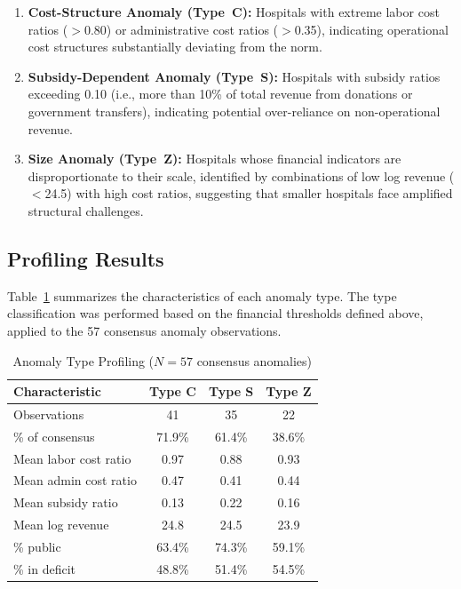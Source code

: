 \documentclass{ieeeaccess}
\begin{document}
\begin{enumerate}
    \item \textbf{Cost-Structure Anomaly (Type~C):} Hospitals with extreme labor cost ratios ($>$0.80) or administrative cost ratios ($>$0.35), indicating operational cost structures substantially deviating from the norm.
    \item \textbf{Subsidy-Dependent Anomaly (Type~S):} Hospitals with subsidy ratios exceeding 0.10 (i.e., more than 10\% of total revenue from donations or government transfers), indicating potential over-reliance on non-operational revenue.
    \item \textbf{Size Anomaly (Type~Z):} Hospitals whose financial indicators are disproportionate to their scale, identified by combinations of low log revenue ($<$24.5) with high cost ratios, suggesting that smaller hospitals face amplified structural challenges.
\end{enumerate}

\subsection{Profiling Results}
\label{subsec:profiling}

Table~\ref{tab:anomaly_types} summarizes the characteristics of each anomaly type. The type classification was performed based on the financial thresholds defined above, applied to the 57 consensus anomaly observations.

\begin{table}[!t]
\centering
\caption{Anomaly Type Profiling ($N = 57$ consensus anomalies)}
\label{tab:anomaly_types}
\begin{tabular}{@{}lccc@{}}
\toprule
\textbf{Characteristic} & \textbf{Type C} & \textbf{Type S} & \textbf{Type Z} \\
\midrule
Observations & 41 & 35 & 22 \\
\% of consensus & 71.9\% & 61.4\% & 38.6\% \\
\midrule
Mean labor cost ratio & 0.97 & 0.88 & 0.93 \\
Mean admin cost ratio & 0.47 & 0.41 & 0.44 \\
Mean subsidy ratio & 0.13 & 0.22 & 0.16 \\
Mean log revenue & 24.8 & 24.5 & 23.9 \\
\% public & 63.4\% & 74.3\% & 59.1\% \\
\% in deficit & 48.8\% & 51.4\% & 54.5\% \\
\bottomrule
\end{tabular}
\end{table}
\end{document}
